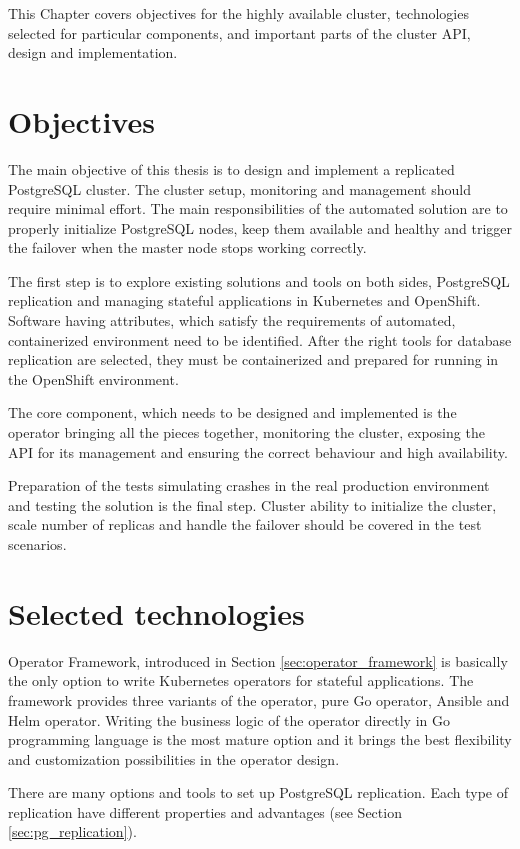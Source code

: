 \documentclass[
  digital, %
  twoside, %
  table,   %
  nolof,   %
  nolot,   %
]{fithesis3}
\begin{document}
This Chapter covers objectives for the highly available cluster, technologies selected for particular components, and important parts of the cluster API, design and implementation.

\section{Objectives}
The main objective of this thesis is to design and implement a replicated PostgreSQL cluster. The cluster setup, monitoring and management should require minimal effort. The main responsibilities of the automated solution are to properly initialize PostgreSQL nodes, keep them available and healthy and trigger the failover when the master node stops working correctly.

The first step is to explore existing solutions and tools on both sides, PostgreSQL replication and managing stateful applications in Kubernetes and OpenShift. Software having attributes, which satisfy the requirements of automated, containerized environment need to be identified. After the right tools for database replication are selected, they must be containerized and prepared for running in the OpenShift environment.

The core component, which needs to be designed and implemented is the operator bringing all the pieces together, monitoring the cluster, exposing the API for its management and ensuring the correct behaviour and high availability.

Preparation of the tests simulating crashes in the real production environment and testing the solution is the final step. Cluster ability to initialize the cluster, scale number of replicas and handle the failover should be covered in the test scenarios.

\section{Selected technologies} \label{sec:selected_technologies}
Operator Framework, introduced in Section \ref{sec:operator_framework} is basically the only option to write Kubernetes operators for stateful applications. The framework provides three variants of the operator, pure Go operator, Ansible and Helm operator. Writing the business logic of the operator directly in Go programming language is the most mature option and it brings the best flexibility and customization possibilities in the operator design.

There are many options and tools to set up PostgreSQL replication. Each type of replication have different properties and advantages (see Section \ref{sec:pg_replication}).
\end{document}
